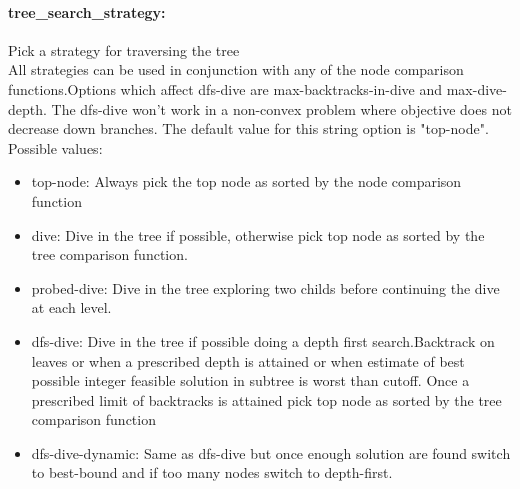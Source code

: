 \paragraph{tree\_search\_strategy:}\label{sec:tree_search_strategy} Pick a strategy for traversing the tree $\;$ \\
 All strategies can be used in conjunction with
any of the node comparison functions.Options
which affect dfs-dive are max-backtracks-in-dive
and max-dive-depth. The dfs-dive won't work in a
non-convex problem where objective does not
decrease down branches.
The default value for this string option is "top-node".
\\ 
Possible values:
\begin{itemize}
   \item top-node:  Always pick the top node as sorted by the node
comparison function
   \item dive: Dive in the tree if possible, otherwise pick
top node as sorted by the tree comparison
function.
   \item probed-dive: Dive in the tree exploring two childs before
continuing the dive at each level.
   \item dfs-dive: Dive in the tree if possible doing a depth
first search.Backtrack on leaves or when a
prescribed depth is attained or when estimate
of best possible integer feasible solution in
subtree is worst than cutoff. Once a prescribed
limit of backtracks is attained pick top node
as sorted by the tree comparison function
   \item dfs-dive-dynamic: Same as dfs-dive but once enough solution are
found switch to best-bound and if too many
nodes switch to depth-first.
\end{itemize}

